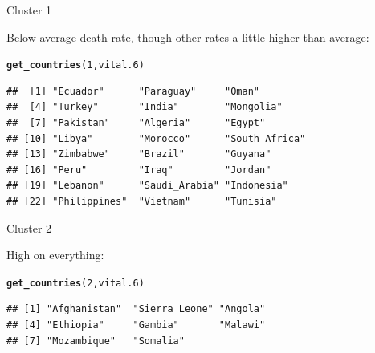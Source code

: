 \documentclass[unknownkeysallowed]{beamer}\usepackage[]{graphicx}\usepackage[]{color}
\makeatletter
\newcommand{\hlnum}[1]{\textcolor[rgb]{0.686,0.059,0.569}{#1}}%
\newcommand{\hlstd}[1]{\textcolor[rgb]{0.345,0.345,0.345}{#1}}%
\newcommand{\hlkwd}[1]{\textcolor[rgb]{0.737,0.353,0.396}{\textbf{#1}}}%
\newenvironment{kframe}{%
 \def\at@end@of@kframe{}%
 \ifinner\ifhmode%
  \def\at@end@of@kframe{\end{minipage}}%
  \begin{minipage}{\columnwidth}%
 \fi\fi%
 \def\FrameCommand##1{\hskip\@totalleftmargin \hskip-\fboxsep
 \colorbox{shadecolor}{##1}\hskip-\fboxsep
     \hskip-\linewidth \hskip-\@totalleftmargin \hskip\columnwidth}%
 \MakeFramed {\advance\hsize-\width
   \@totalleftmargin\z@ \linewidth\hsize
   \@setminipage}}%
 {\par\unskip\endMakeFramed%
 \at@end@of@kframe}
\newenvironment{knitrout}{}{} %
\makeatother
\begin{document}
\begin{frame}[fragile]{Cluster 1}

  Below-average death rate, though other rates a little higher than average:

  
\begin{knitrout}
\color{fgcolor}\begin{kframe}
\begin{alltt}
\hlkwd{get_countries}\hlstd{(}\hlnum{1}\hlstd{,vital.6)}
\end{alltt}
\begin{verbatim}
##  [1] "Ecuador"      "Paraguay"     "Oman"        
##  [4] "Turkey"       "India"        "Mongolia"    
##  [7] "Pakistan"     "Algeria"      "Egypt"       
## [10] "Libya"        "Morocco"      "South_Africa"
## [13] "Zimbabwe"     "Brazil"       "Guyana"      
## [16] "Peru"         "Iraq"         "Jordan"      
## [19] "Lebanon"      "Saudi_Arabia" "Indonesia"   
## [22] "Philippines"  "Vietnam"      "Tunisia"
\end{verbatim}
\end{kframe}
\end{knitrout}
  
\end{frame}
\begin{frame}[fragile]{Cluster 2}

    High on everything:
  
\begin{knitrout}\small
{}\color{fgcolor}\begin{kframe}
\begin{alltt}
\hlkwd{get_countries}\hlstd{(}\hlnum{2}\hlstd{,vital.6)}
\end{alltt}
\begin{verbatim}
## [1] "Afghanistan"  "Sierra_Leone" "Angola"      
## [4] "Ethiopia"     "Gambia"       "Malawi"      
## [7] "Mozambique"   "Somalia"
\end{verbatim}
\end{kframe}
\end{knitrout}
  
\end{frame}
\end{document}
